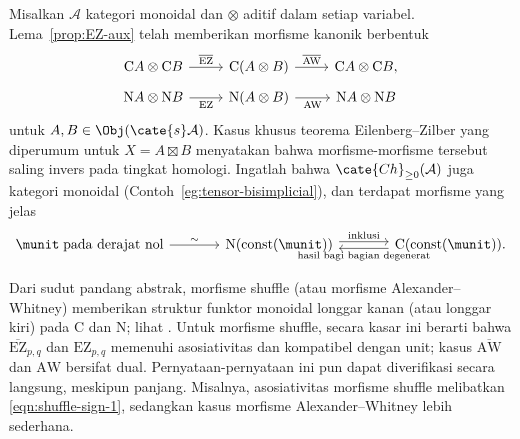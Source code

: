 \begin{remark}
	Misalkan $\mathcal{A}$ kategori monoidal dan $\otimes$ aditif dalam
	setiap variabel. Lema~\ref{prop:EZ-aux} telah memberikan
	morfisme kanonik berbentuk
	\[\begin{tikzcd}[row sep=tiny]
		\mathrm{C}A \otimes \mathrm{C}B \arrow[r, "{\overline{\mathrm{EZ}}}"] & \mathrm{C}(A \otimes B) \arrow[r, "{\overline{\mathrm{AW}}}"] & \mathrm{C}A \otimes \mathrm{C}B, \\
		\mathrm{N}A \otimes \mathrm{N}B \arrow[r, "\mathrm{EZ}"'] & \mathrm{N}(A \otimes B) \arrow[r, "{\mathrm{AW}}"'] & \mathrm{N}A \otimes \mathrm{N}B
	\end{tikzcd}\]
	untuk $A,B\in\Obj(\cate{s}\mathcal{A})$. Kasus khusus teorema
	Eilenberg--Zilber yang diperumum untuk $X=A\boxtimes B$ menyatakan
	bahwa morfisme-morfisme tersebut saling invers pada tingkat homologi.
	Ingatlah bahwa $\cate{Ch}_{\geq0}(\mathcal{A})$ juga kategori monoidal
	(Contoh~\ref{eg:tensor-bisimplicial}), dan terdapat morfisme yang jelas
	\[\begin{tikzcd}[column sep=large]
		\munit \;\text{pada derajat nol} \arrow[r, "\sim"] & \mathrm{N}(\mathrm{const}(\munit)) \arrow[shift left, r, "\text{inklusi}"] & \mathrm{C}(\mathrm{const}(\munit)). \arrow[shift left, l, "\text{hasil bagi bagian degenerat}"]
	\end{tikzcd}\]

	Dari sudut pandang abstrak, morfisme shuffle (atau morfisme
	Alexander--Whitney) memberikan struktur funktor
	monoidal longgar kanan (atau longgar kiri) pada $\mathrm{C}$ dan
	$\mathrm{N}$; lihat \cite[Catatan 3.1.8]{Li1}. Untuk morfisme shuffle,
	secara kasar ini berarti bahwa $\overline{\mathrm{EZ}}_{p,q}$ dan
	$\mathrm{EZ}_{p,q}$ memenuhi asosiativitas dan kompatibel dengan unit;
	kasus $\overline{\mathrm{AW}}$ dan $\mathrm{AW}$ bersifat dual.
	Pernyataan-pernyataan ini pun dapat diverifikasi secara langsung,
	meskipun panjang. Misalnya, asosiativitas morfisme shuffle melibatkan
	\eqref{eqn:shuffle-sign-1}, sedangkan kasus morfisme Alexander--Whitney
	lebih sederhana.


\end{remark}
